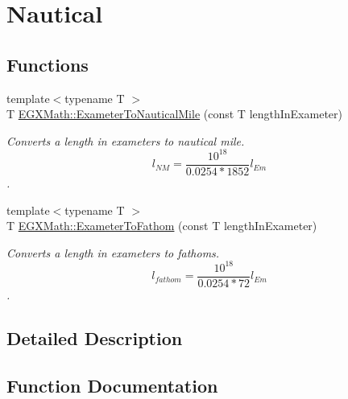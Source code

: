 \hypertarget{group___e_g_x_math-_conversions-_length_conversions-_exameter-_nautical}{}\section{Nautical}
\label{group___e_g_x_math-_conversions-_length_conversions-_exameter-_nautical}
\subsection*{Functions}
\begin{DoxyCompactItemize}
\item 
{\footnotesize template$<$typename T $>$ }\\T \mbox{\hyperlink{group___e_g_x_math-_conversions-_length_conversions-_exameter-_nautical_gaf593ae9d78bd889caca4e9249be1464a}{E\+G\+X\+Math\+::\+Exameter\+To\+Nautical\+Mile}} (const T length\+In\+Exameter)
\begin{DoxyCompactList}\small\item\em Converts a length in exameters to nautical mile. \[ l_{NM}= \frac{10^{18}}{0.0254 * 1852} l_{Em} \]. \end{DoxyCompactList}\item 
{\footnotesize template$<$typename T $>$ }\\T \mbox{\hyperlink{group___e_g_x_math-_conversions-_length_conversions-_exameter-_nautical_gab6f73111fd59a46fb28473d73ddb6033}{E\+G\+X\+Math\+::\+Exameter\+To\+Fathom}} (const T length\+In\+Exameter)
\begin{DoxyCompactList}\small\item\em Converts a length in exameters to fathoms. \[ l_{fathom}= \frac{10^{18}}{0.0254 * 72} l_{Em} \]. \end{DoxyCompactList}\end{DoxyCompactItemize}


\subsection{Detailed Description}


\subsection{Function Documentation}
\mbox{\label{group___e_g_x_math-_conversions-_length_conversions-_exameter-_nautical_gab6f73111fd59a46fb28473d73ddb6033}} 
